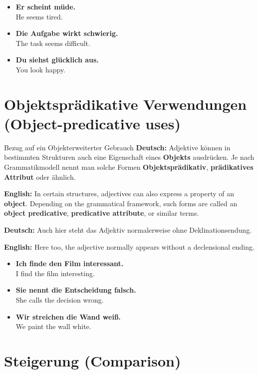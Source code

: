 \documentclass[a4paper,11pt]{article}
\newcommand{\GermanText}[1]{\textbf{Deutsch: }#1\par}
\newcommand{\EnglishText}[1]{{\small\color{SoftGray}\textbf{English: }#1\par}}
\newcommand{\ExampleItem}[2]{\item \textbf{#1}\\{\small\color{SoftGray}#2}}
\begin{document}
        \begin{exbox}
            \begin{itemize}
                \ExampleItem{Er scheint müde.}{He seems tired.}
                \ExampleItem{Die Aufgabe wirkt schwierig.}{The task seems difficult.}
                \ExampleItem{Du siehst glücklich aus.}{You look happy.}
            \end{itemize}
        \end{exbox}

    \section{Objektsprädikative Verwendungen \textnormal{(Object-predicative uses)}}

        \begin{grammarentry}{Bezug auf ein Objekt}{erweiterter Gebrauch}
            \GermanText{Adjektive können in bestimmten Strukturen auch eine Eigenschaft eines \textbf{Objekts} ausdrücken. Je nach Grammatikmodell nennt man solche Formen \textbf{Objektsprädikativ}, \textbf{prädikatives Attribut} oder ähnlich.}
            \EnglishText{In certain structures, adjectives can also express a property of an \textbf{object}. Depending on the grammatical framework, such forms are called an \textbf{object predicative}, \textbf{predicative attribute}, or similar terms.}

            \GermanText{Auch hier steht das Adjektiv normalerweise ohne Deklinationsendung.}
            \EnglishText{Here too, the adjective normally appears without a declensional ending.}
        \end{grammarentry}

        \begin{exbox}
            \begin{itemize}
                \ExampleItem{Ich finde den Film interessant.}{I find the film interesting.}
                \ExampleItem{Sie nennt die Entscheidung falsch.}{She calls the decision wrong.}
                \ExampleItem{Wir streichen die Wand weiß.}{We paint the wall white.}
            \end{itemize}
        \end{exbox}

    \section{Steigerung \textnormal{(Comparison)}}
\end{document}
